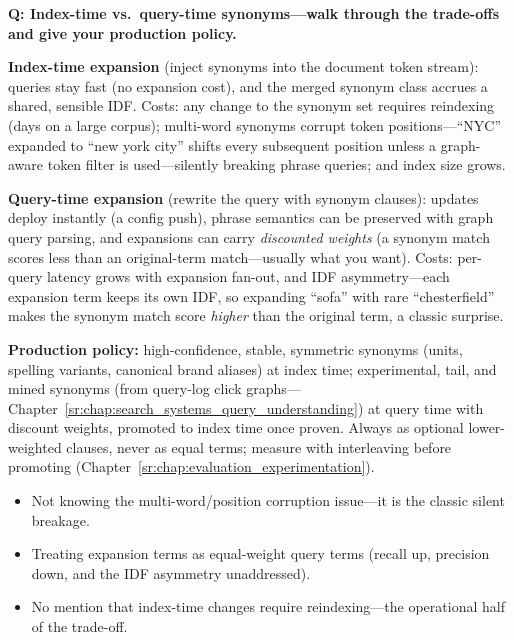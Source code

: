 \begin{interviewq}
\textbf{Q: Index-time vs.\ query-time synonyms---walk through the trade-offs and give your production policy.}

 \quad {} \quad \badgefreq{\freqmed}

\stronganswer

\textbf{Index-time expansion} (inject synonyms into the document token stream): queries stay fast (no expansion cost), and the merged synonym class accrues a shared, sensible IDF. Costs: any change to the synonym set requires reindexing (days on a large corpus); multi-word synonyms corrupt token positions---``NYC'' expanded to ``new york city'' shifts every subsequent position unless a graph-aware token filter is used---silently breaking phrase queries; and index size grows.

\textbf{Query-time expansion} (rewrite the query with synonym clauses): updates deploy instantly (a config push), phrase semantics can be preserved with graph query parsing, and expansions can carry \emph{discounted weights} (a synonym match scores less than an original-term match---usually what you want). Costs: per-query latency grows with expansion fan-out, and IDF asymmetry---each expansion term keeps its own IDF, so expanding ``sofa'' with rare ``chesterfield'' makes the synonym match score \emph{higher} than the original term, a classic surprise.

\textbf{Production policy:} high-confidence, stable, symmetric synonyms (units, spelling variants, canonical brand aliases) at index time; experimental, tail, and mined synonyms (from query-log click graphs---Chapter~\ref{sr:chap:search_systems_query_understanding}) at query time with discount weights, promoted to index time once proven. Always as optional lower-weighted clauses, never as equal terms; measure with interleaving before promoting (Chapter~\ref{sr:chap:evaluation_experimentation}).

\redflags
\begin{itemize}
    \item Not knowing the multi-word/position corruption issue---it is the classic silent breakage.
    \item Treating expansion terms as equal-weight query terms (recall up, precision down, and the IDF asymmetry unaddressed).
    \item No mention that index-time changes require reindexing---the operational half of the trade-off.
\end{itemize}


\end{interviewq}
